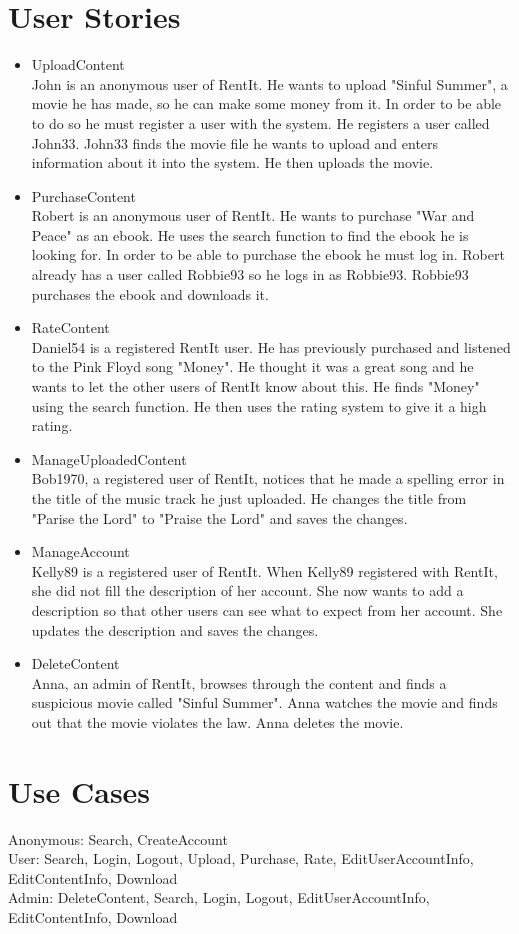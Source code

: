 \documentclass[../report.tex]{subfiles}
\begin{document}
\section{User Stories}
\begin{itemize}
\item UploadContent \\
John is an anonymous user of RentIt. He wants to upload "Sinful Summer", a movie he has made, so he can make some money from it. In order to be able to do so he must register a user with the system. He registers a user called John33. John33 finds the movie file he wants to upload and enters information about it into the system. He then uploads the movie.
\item PurchaseContent \\
Robert is an anonymous user of RentIt. He wants to purchase "War and Peace" as an ebook. He uses the search function to find the ebook he is looking for. In order to be able to purchase the ebook he must log in. Robert already has a user called Robbie93 so he logs in as Robbie93. Robbie93 purchases the ebook and downloads it.
\item RateContent \\
Daniel54 is a registered RentIt user. He has previously purchased and listened to the Pink Floyd song "Money". He thought it was a great song and he wants to let the other users of RentIt know about this. He finds "Money" using the search function. He then uses the rating system to give it a high rating.
\item ManageUploadedContent \\
Bob1970, a registered user of RentIt, notices that he made a spelling error in the title of the music track he just uploaded. He changes the title from "Parise the Lord" to "Praise the Lord" and saves the changes.
\item ManageAccount \\
Kelly89 is a registered user of RentIt. When Kelly89 registered with RentIt, she did not fill the description of her account. She now wants to add a description so that other users can see what to expect from her account. She updates the description and saves the changes.
\item DeleteContent \\
Anna, an admin of RentIt, browses through the content and finds a suspicious movie called "Sinful Summer". Anna watches the movie and finds out that the movie violates the law. Anna deletes the movie.
\end{itemize}

\section{Use Cases}
Anonymous: Search, CreateAccount \\
User: Search, Login, Logout, Upload, Purchase, Rate, EditUserAccountInfo, EditContentInfo, Download \\
Admin: DeleteContent, Search, Login, Logout, EditUserAccountInfo, EditContentInfo, Download
\end{document}
